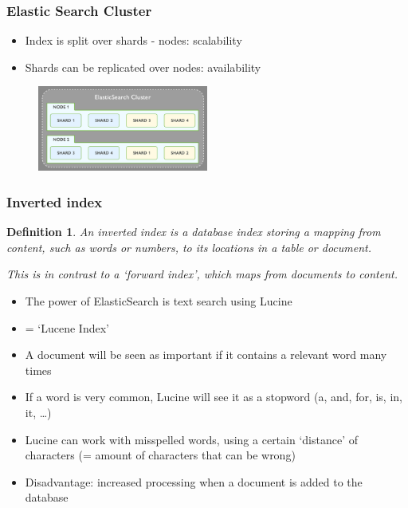 \documentclass{article}
\newtheorem{theorem}{Definition}[section]
\begin{document}
\subsubsection{Elastic Search Cluster}

\begin{itemize}
    \item Index is split over shards - nodes: scalability
    \item Shards can be replicated over nodes: availability
\end{itemize}

\begin{figure}[H]
    \centering
    \includegraphics[width=0.5\textwidth]{elasticsearch-searchcluster.png}
\end{figure}

\subsubsection{Inverted index}

\begin{theorem}
    An inverted index is a database index storing a mapping from content, such as words or numbers, to its locations in a table or document.

    This is in contrast to a `forward index', which maps from documents to content.
\end{theorem}

\begin{itemize}
    \item The power of ElasticSearch is text search using Lucine
    \item = `Lucene Index'
    \item A document will be seen as important if it contains a relevant word many times
    \item If a word is very common, Lucine will see it as a stopword (a, and, for, is, in, it, \dots)
    \item Lucine can work with misspelled words, using a certain `distance' of characters (= amount of characters that can be wrong)
    \item Disadvantage: increased processing when a document is added to the database
\end{itemize}
\end{document}
